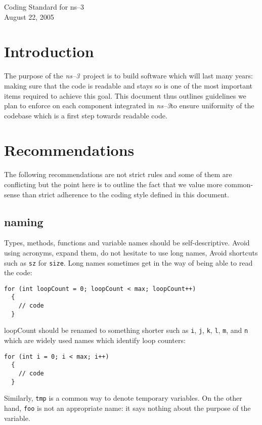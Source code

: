 \documentclass[11pt]{article}
\def\nst{{\em ns--3}}
\newcommand{\code}[1]{\texttt{#1}}
\begin{document}
\begin{center}
{\Large Coding Standard for ns--3}\\
August 22, 2005

\end{center}
\section{Introduction}

The purpose of the \nst\ project is to build software which will last
many years: making sure that the code is readable and stays so is 
one of the most important items required to achieve this goal. This
document thus outlines guidelines we plan to enforce on each component
integrated in \nst to ensure uniformity of the codebase which is
a first step towards readable code.

\section{Recommendations}

The following recommendations are not strict rules and some of them
are conflicting but the point here is to outline the fact that we
value more common-sense than strict adherence to the coding style
defined in this document.

\subsection{naming}

Types, methods, functions and variable names should be self-descriptive. 
Avoid using acronyms, expand them, do not hesitate to use long names,
Avoid shortcuts such as \code{sz} for \code{size}. Long names sometimes get in the 
way of being able to read the code:
\begin{verbatim}
for (int loopCount = 0; loopCount < max; loopCount++) 
  {
    // code
  }
\end{verbatim}
loopCount should be renamed to something shorter such as 
\code{i}, \code{j}, \code{k}, \code{l}, \code{m}, and \code{n} 
which are widely used names which identify loop counters:
\begin{verbatim}
for (int i = 0; i < max; i++) 
  {
    // code
  }
\end{verbatim}
Similarly, \code{tmp} is a common way to denote temporary variables. On
the other hand, \code{foo} is not an appropriate name: it says nothing
about the purpose of the variable.
\end{document}
